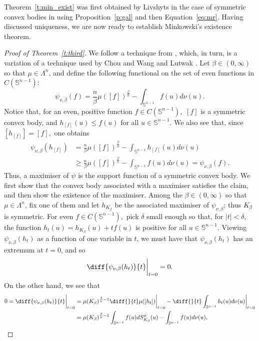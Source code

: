\documentclass[11pt]{amsart}
\theoremstyle{definition}
\theoremstyle{remark}
\numberwithin{equation}{section}
\newcommand{\s}{\mathbb{S}}
\begin{document}
Theorem~\ref{t:min_exist} was first obtained by Livshyts in the case of symmetric convex bodies in \cite{GAL19} using Proposition~\ref{p:gal} and then Equation~\ref{eq:mr}. Having discussed uniqueness, we are now ready to establish Minkowski's existence theorem.
\begin{proof}[Proof of Theorem~\ref{t:third}]
We follow a technique from \cite{HLYZ10}, which, in turn, is a variation of a technique used by Chou and Wang \cite{CW06} and Lutwak \cite{LE93}. Let $\beta\in(0,\infty)$ so that $\mu\in\Lambda^n$, and define the following functional on the set of even functions in $C(\s^{n-1})$:
\begin{equation}
    \psi_{\nu,\beta}(f)=\frac{n}{\beta}\mu\left([f]\right)^\frac{\beta}{n}-\int_{\s^{n-1}}f(u)d\nu(u).
    \label{eq:functional}
\end{equation}
Notice that, for an even, positive function $f\in C(\s^{n-1}),$ $[f]$ is a symmetric convex body, and $h_{[f]} (u) \leq f(u)$ for all $u\in\s^{n-1}$. We also see that, since $[h_{[f]}]=[f],$ one obtains
\begin{align*}
    \psi_{\nu,\beta}(h_{[f]})&= \frac{n}{\beta}\mu\left([f]\right)^\frac{\beta}{n}-\int_{\s^{n-1}}h_{[f]}(u)d\nu(u)
    \\
    &\geq \frac{n}{\beta}\mu\left([f]\right)^\frac{\beta}{n}-\int_{\s^{n-1}}f(u)d\nu(u)=\psi_{\nu,\beta}(f).
\end{align*}
Thus, a maximiser of $\psi$ is the support function of a symmetric convex body. We first show that the convex body associated with a maximiser satisfies the claim, and then show the existence of the maximiser. Among the $\beta\in(0,\infty)$ so that $\mu\in\Lambda^n$, fix one of them and let $h_{K_\beta}$ be the associated maximiser of $\psi_{\nu,\beta}$; thus $K_\beta$ is symmetric. For even $f\in C(\s^{n-1}),$ pick $\delta$ small enough so that, for $|t|<\delta$, the function
$h_t(u)=h_{K_\beta}(u)+tf(u)$ is positive for all $u\in\s^{n-1}$. Viewing $\psi_{\nu,\beta}(h_t)$ as a function of one variable in $t$, we must have that $\psi_{\nu,\beta}(h_t)$ has an extremum at $t=0$, and so
$$\diff{\psi_{\nu,\beta}(h_t)}{t}\bigg|_{t=0}=0.$$
On the other hand, we see that
\begin{align*}0=\diff{\psi_{\nu,\beta}(h_t)}{t}\bigg|_{t=0}&=\mu(K_\beta)^{\frac{\beta}{n}-1}\diff{}{t}\mu([h_t])\bigg|_{t=0}-\diff{}{t}\int_{\s^{n-1}}h_{t}(u)d\nu(u)\bigg|_{t=0}
\\
&=\mu(K_\beta)^{\frac{\beta}{n}-1}\int_{\s^{n-1}}f(u)dS^{\mu}_{K_{\beta}}(u)-\int_{\s^{n-1}}f(u)d\nu(u),\end{align*}

\end{proof}
\end{document}
